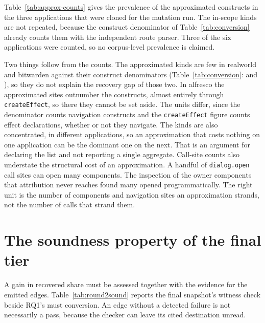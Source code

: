Table~\ref{tab:approx-counts} gives the prevalence of the approximated constructs in the
three applications that were cloned for the mutation run. The in-scope kinds are not
repeated, because the construct denominator of Table~\ref{tab:conversion} already
counts them with the independent route parser. Three of the six
applications were counted, so no corpus-level prevalence is claimed.

\begin{table}[t]\small
\caption{Prevalence of the approximated constructs in three of the six applications,
produced by \texttt{approx-counts.mjs} in the harness. The figures are call-site counts
over the application sources with tests excluded, taken at the pinned corpus commits.
They are a different unit from the construct denominator of
Chapter~\ref{ch:results}, which comes from the independent route parser.}
\label{tab:approx-counts}
\TabApproxCounts
\end{table}

Two things follow from the counts.
The approximated kinds are few in realworld and bitwarden against their construct denominators
(Table~\ref{tab:conversion}: \ConstructsRealworld{} and \ConstructsBitwarden{}), so they do not explain
the recovery gap of those two.
In alfresco the approximated sites outnumber the \ConstructsAlfresco{} constructs, almost entirely
through \texttt{createEffect}, so there they cannot be set aside.
The units differ, since the denominator counts navigation constructs and the \texttt{createEffect}
figure counts effect declarations, whether or not they navigate.
The kinds are also concentrated, in different applications, so an approximation that costs nothing on
one application can be the dominant one on the next.
That is an argument for declaring the list and not reporting a single aggregate.
Call-site counts also understate the structural cost of an approximation.
A handful of \texttt{dialog.open} call sites can open many components.
The inspection of the owner components that attribution never reaches found many opened
programmatically.
The right unit is the number of components and navigation sites an approximation strands, not the number
of calls that strand them.


\section{The soundness property of the final tier}
\label{sec:res-soundness}

A gain in recovered share must be assessed together with the evidence for the emitted edges.
Table~\ref{tab:round2sound} reports the final snapshot's witness check beside RQ1's must conversion.
An edge without a detected failure is not necessarily a pass, because the checker can leave its
cited destination unread.

